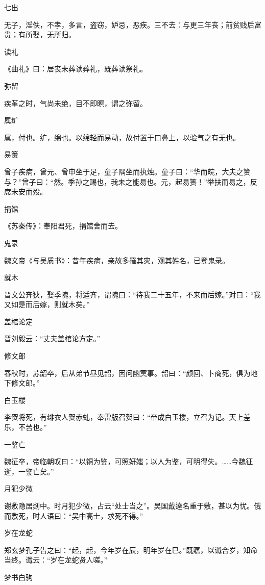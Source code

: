 \documentclass[a4paper,12pt,UTF8,twoside]{ctexbook}
\begin{document}
    七出
    
    无子，淫佚，不孝，多言，盗窃，妒忌，恶疾。三不去：与更三年丧；前贫贱后富贵；有所娶，无所归。
    
    读礼
    
    《曲礼》曰：居丧未葬读葬礼，既葬读祭礼。
    
    弥留
    
    疾革之时，气尚未绝，目不即瞑，谓之弥留。
    
    属纩
    
    属，付也。纩，绵也。以绵轻而易动，故付置于口鼻上，以验气之有无也。
    
    易箦
    
    曾子疾病，曾元、曾申坐于足，童子隅坐而执烛。童子曰：“华而皖，大夫之箦与？”曾子曰：“然。季孙之赐也，我未之能易也。元，起易箦！”举扶而易之，反席未安而殁。
    
    捐馆
    
    《苏秦传》：奉阳君死，捐馆舍而去。
    
    鬼录
    
    魏文帝《与吴质书》：昔年疾病，亲故多罹其灾，观其姓名，已登鬼录。
    
    就木
    
    晋文公奔狄，娶季隗，将适齐，谓隗曰：“待我二十五年，不来而后嫁。”对曰：“我又如是而后嫁，则就木矣。”
    
    盖棺论定
    
    晋刘毅云：“丈夫盖棺论方定。”
    
    修文郎
    
    春秋时，苏韶卒，后从弟节昼见韶，因问幽冥事。韶曰：“颜回、卜商死，俱为地下修文郎。”
    
    白玉楼
    
    李贺将死，有绯衣人贺赤虬，奉雷版召贺曰：“帝成白玉楼，立召为记。天上差乐，不苦也。”
    
    一鉴亡
    
    魏征卒，帝临朝叹曰：“以铜为鉴，可照妍媸；以人为鉴，可明得失。……今魏征逝，一鉴亡矣。”
    
    月犯少微
    
    谢敷隐居剡中。时月犯少微，占云“处士当之”。吴国戴逵名重于敷，甚以为忧。俄而敷死，时人语曰：“吴中高士，求死不得。”
    
    岁在龙蛇
    
    郑玄梦孔子告之曰：“起，起，今年岁在辰，明年岁在巳。”既寤，以谶合岁，知命当终。谶云：“岁在龙蛇贤人嗟。”
    
    梦书白驹
    
\end{document}
